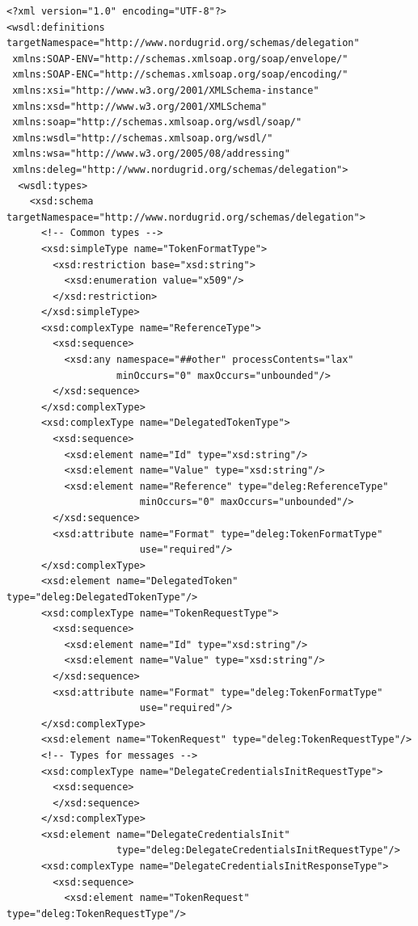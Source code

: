 \documentclass{article}                            %
\begin{document}
\begin{footnotesize}\begin{verbatim}
<?xml version="1.0" encoding="UTF-8"?>
<wsdl:definitions targetNamespace="http://www.nordugrid.org/schemas/delegation"
 xmlns:SOAP-ENV="http://schemas.xmlsoap.org/soap/envelope/"
 xmlns:SOAP-ENC="http://schemas.xmlsoap.org/soap/encoding/"
 xmlns:xsi="http://www.w3.org/2001/XMLSchema-instance"
 xmlns:xsd="http://www.w3.org/2001/XMLSchema"
 xmlns:soap="http://schemas.xmlsoap.org/wsdl/soap/"
 xmlns:wsdl="http://schemas.xmlsoap.org/wsdl/"
 xmlns:wsa="http://www.w3.org/2005/08/addressing"
 xmlns:deleg="http://www.nordugrid.org/schemas/delegation">
  <wsdl:types>
    <xsd:schema targetNamespace="http://www.nordugrid.org/schemas/delegation">
      <!-- Common types -->
      <xsd:simpleType name="TokenFormatType">
        <xsd:restriction base="xsd:string">
          <xsd:enumeration value="x509"/>
        </xsd:restriction>
      </xsd:simpleType>
      <xsd:complexType name="ReferenceType">
        <xsd:sequence>
          <xsd:any namespace="##other" processContents="lax"
                   minOccurs="0" maxOccurs="unbounded"/>
        </xsd:sequence>
      </xsd:complexType>
      <xsd:complexType name="DelegatedTokenType">
        <xsd:sequence>
          <xsd:element name="Id" type="xsd:string"/>
          <xsd:element name="Value" type="xsd:string"/>
          <xsd:element name="Reference" type="deleg:ReferenceType"
                       minOccurs="0" maxOccurs="unbounded"/>
        </xsd:sequence>
        <xsd:attribute name="Format" type="deleg:TokenFormatType"
                       use="required"/>
      </xsd:complexType>
      <xsd:element name="DelegatedToken" type="deleg:DelegatedTokenType"/>
      <xsd:complexType name="TokenRequestType">
        <xsd:sequence>
          <xsd:element name="Id" type="xsd:string"/>
          <xsd:element name="Value" type="xsd:string"/>
        </xsd:sequence>
        <xsd:attribute name="Format" type="deleg:TokenFormatType"
                       use="required"/>
      </xsd:complexType>
      <xsd:element name="TokenRequest" type="deleg:TokenRequestType"/>
      <!-- Types for messages -->
      <xsd:complexType name="DelegateCredentialsInitRequestType">
        <xsd:sequence>
        </xsd:sequence>
      </xsd:complexType>
      <xsd:element name="DelegateCredentialsInit"
                   type="deleg:DelegateCredentialsInitRequestType"/>
      <xsd:complexType name="DelegateCredentialsInitResponseType">
        <xsd:sequence>
          <xsd:element name="TokenRequest" type="deleg:TokenRequestType"/>

\end{verbatim}
\end{footnotesize}
\end{document}
